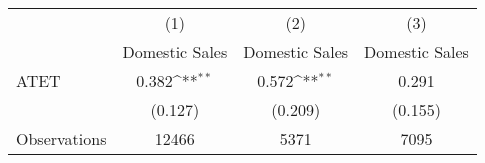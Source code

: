 {
\def\sym#1{\ifmmode^{#1}\else\(^{#1}\)\fi}
\begin{tabular}{l*{3}{c}}
\hline\hline
                    &\multicolumn{1}{c}{(1)}&\multicolumn{1}{c}{(2)}&\multicolumn{1}{c}{(3)}\\
                    &\multicolumn{1}{c}{Domestic Sales}&\multicolumn{1}{c}{Domestic Sales}&\multicolumn{1}{c}{Domestic Sales}\\
\hline
ATET                &       0.382\sym{**} &       0.572\sym{**} &       0.291         \\
                    &     (0.127)         &     (0.209)         &     (0.155)         \\
\hline
Observations        &       12466         &        5371         &        7095         \\
\hline\hline
\end{tabular}
}
